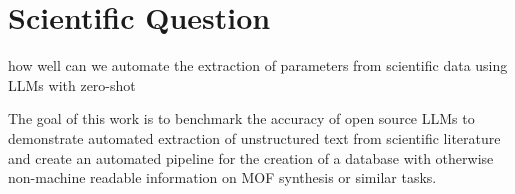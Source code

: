 \newpage
\section{Scientific Question}\label{sec:question}

how well can we automate the extraction of parameters from scientific data using \glspl{LLM} with zero-shot

The goal of this work is to benchmark the accuracy of open source \glspl{LLM} to
demonstrate automated extraction of unstructured text from scientific
literature and create an automated pipeline for the creation of a database with otherwise non-machine readable information on \gls{MOF} synthesis or similar tasks.

%
